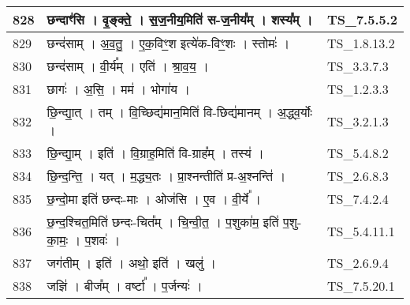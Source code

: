 \documentclass[17pt]{extarticle}
\begin{document}
\begin{longtable}{||p{0.4in}||p{4.9in}||p{0.9in}||}
    \hline
        
    828 & छन्दाꣳ॑सि   ।   वृ॒ङ्क्ते॒   ।   स॒ज॒नीय॒मिति॑ स{-}ज॒नीय᳚म्   ।   शस्य᳚म्   ।    & TS\_7.5.5.2       \\
    
    \hline
        
    829 & छन्द॑साम्   ।   अ॒व॒तु॒   ।   ए॒क॒विꣳ॒॒श इत्ये॑क{-}विꣳ॒॒शः   ।   स्तोमः॑   ।    & TS\_1.8.13.2       \\
    
    \hline
        
    830 & छन्द॑साम्   ।   वी॒र्य᳚म्   ।   एति॑   ।   श्रा॒व॒य॒   ।    & TS\_3.3.7.3       \\
    
    \hline
        
    831 & छागः॑   ।   अ॒सि॒   ।   मम॑   ।   भोगा॑य   ।    & TS\_1.2.3.3       \\
    
    \hline
        
    832 & छि॒न्द्या॒त्   ।   तम्   ।   वि॒च्छिद्य॑मान॒मिति॑ वि{-}छिद्य॑मानम्   ।   अ॒द्ध्व॒र्योः   ।    & TS\_3.2.1.3       \\
    
    \hline
        
    833 & छि॒न्द्या॒म्   ।   इति॑   ।   वि॒ग्राह॒मिति॑ वि{-}ग्राह᳚म्   ।   तस्य॑   ।    & TS\_5.4.8.2       \\
    
    \hline
        
    834 & छि॒न्द॒न्ति॒   ।   यत्   ।   म॒द्ध्य॒तः   ।   प्रा॒श्नन्तीति॑ प्र{-}अ॒श्नन्ति॑   ।    & TS\_2.6.8.3       \\
    
    \hline
        
    835 & छ॒न्दो॒मा इति॑ छन्दः{-}माः   ।   ओज॑सि   ।   ए॒व   ।   वी॒र्ये᳚   ।    & TS\_7.4.2.4       \\
    
    \hline
        
    836 & छ॒न्द॒श्चित॒मिति॑ छन्दः{-}चित᳚म्   ।   चि॒न्वी॒त॒   ।   प॒शुका॑म॒ इति॑ प॒शु{-}का॒मः॒   ।   प॒शवः॑   ।    & TS\_5.4.11.1       \\
    
    \hline
        
    837 & जग॑तीम्   ।   इति॑   ।   अथो॒ इति॑   ।   खलु॑   ।    & TS\_2.6.9.4       \\
    
    \hline
        
    838 & जज्ञि॑   ।   बीज᳚म्   ।   वर्ष्टा᳚   ।   प॒र्जन्यः॑   ।    & TS\_7.5.20.1       \\
    

\end{longtable}
\end{document}
